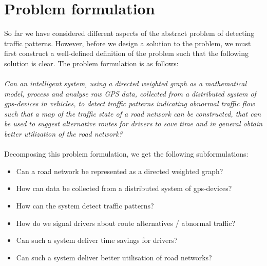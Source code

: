 \section{Problem formulation}
So far we have considered different aspects of the abstract problem of detecting traffic patterns. However, before we design a solution to the problem, we must first construct a well-defined definition of the problem such that the following solution is clear. The problem formulation is as follows:
\\\\
\emph{Can an intelligent system, using a directed weighted graph as a mathematical model, process and analyse raw GPS data, collected from a distributed system of gps-devices in vehicles, to detect traffic patterns indicating abnormal traffic flow such that a map of the traffic state of a road network can be constructed, that can be used to suggest alternative routes for drivers to save time and in general obtain better utilization of the road network?}
\\\\
Decomposing this problem formulation, we get the following subformulations:

\begin{itemize}
\item Can a road network be represented as a directed weighted graph?
\item How can data be collected from a distributed system of gps-devices?
\item How can the system detect traffic patterns?
\item How do we signal drivers about route alternatives / abnormal traffic?
\item Can such a system deliver time savings for drivers?
\item Can such a system deliver better utilisation of road networks?
\end{itemize}




